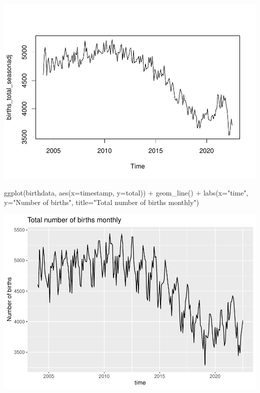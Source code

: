 \documentclass[
]{article}
\newenvironment{Shaded}{\begin{snugshade}}{\end{snugshade}}
\newcommand{\AttributeTok}[1]{\textcolor[rgb]{0.77,0.63,0.00}{#1}}
\newcommand{\FunctionTok}[1]{\textcolor[rgb]{0.00,0.00,0.00}{#1}}
\newcommand{\NormalTok}[1]{#1}
\newcommand{\SpecialCharTok}[1]{\textcolor[rgb]{0.00,0.00,0.00}{#1}}
\newcommand{\StringTok}[1]{\textcolor[rgb]{0.31,0.60,0.02}{#1}}
\begin{document}
\includegraphics{GoogleTrendsMarkdown_files/figure-latex/unnamed-chunk-4-1.pdf}

\begin{Shaded}
\begin{Highlighting}[]
\FunctionTok{ggplot}\NormalTok{(birthdata, }\FunctionTok{aes}\NormalTok{(}\AttributeTok{x=}\NormalTok{timestamp, }\AttributeTok{y=}\NormalTok{total)) }\SpecialCharTok{+} \FunctionTok{geom\_line}\NormalTok{() }\SpecialCharTok{+} \FunctionTok{labs}\NormalTok{(}\AttributeTok{x=}\StringTok{"time"}\NormalTok{, }\AttributeTok{y=}\StringTok{"Number of births"}\NormalTok{, }\AttributeTok{title=}\StringTok{"Total number of births monthly"}\NormalTok{) }
\end{Highlighting}
\end{Shaded}

\includegraphics{GoogleTrendsMarkdown_files/figure-latex/unnamed-chunk-4-2.pdf}
\end{document}

